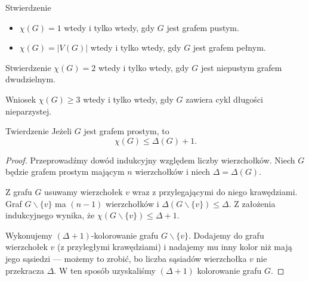 \documentclass[a4paper,10pt]{beamer}
\begin{document}
\begin{frame}

	\begin{block}{Stwierdzenie}
		\begin{itemize}
			\item $\chi(G)=1$ wtedy i tylko wtedy, gdy $G$ jest grafem pustym.
			\item $\chi(G)=|V(G)|$ wtedy i tylko wtedy, gdy $G$ jest grafem pełnym.
		\end{itemize}
	\end{block}

\medskip

	\begin{block}{Stwierdzenie}
		$\chi(G)=2$ wtedy i tylko wtedy, gdy $G$ jest niepustym grafem dwudzielnym.
	\end{block}

\medskip

	\begin{block}{Wniosek}
		$\chi(G)\geqslant3$ wtedy i tylko wtedy, gdy $G$ zawiera cykl długości nieparzystej.
	\end{block}

\end{frame}


\begin{frame}

\begin{block}{Twierdzenie}%
 	Jeżeli $G$ jest grafem prostym, to $$\chi(G)\leqslant\Delta(G)+1.$$
\end{block}


\begin{proof}
Przeprowadźmy dowód indukcyjny względem liczby wierzchołków. Niech $G$ będzie grafem prostym mającym $n$ wierzchołków i niech $\Delta=\Delta(G)$.

Z grafu $G$ usuwamy wierzchołek $v$ wraz z przylegającymi do niego krawędziami. Graf $G\backslash\{v\}$ ma $(n-1)$ wierzchołków i $\Delta(G\backslash\{v\})\leqslant\Delta$.
Z założenia indukcyjnego wynika, że $\chi(G\backslash\{v\})\leqslant\Delta+1$.

Wykonujemy $(\Delta+1)$-kolorowanie grafu $G\backslash\{v\}$. Dodajemy do grafu wierzchołek $v$ (z przyległymi krawędziami) i nadajemy mu inny kolor niż mają jego sąsiedzi --- możemy to zrobić, bo liczba sąsiadów wierzchołka $v$ nie przekracza $\Delta$. W ten sposób uzyskaliśmy $(\Delta+1)$ kolorowanie grafu $G$.

\end{proof}


\end{frame}
\end{document}
